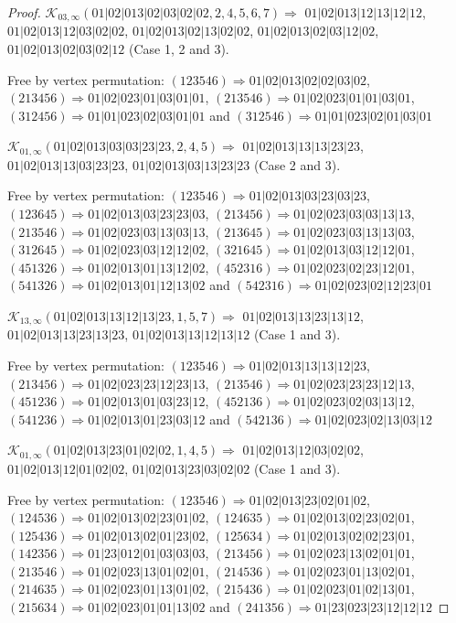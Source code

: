 \documentclass[12pt]{article}
\theoremstyle{plain}
\theoremstyle{definition}
\theoremstyle{remark}
\newcommand{\fancy}[1]{\mathcal{#1}}
\def\K{\fancy{K}}
\begin{document}
\begin{proof}
	
	\bigskip
	
	$\K_{03,\infty}(01|02|013|02|03|02|02,2, 4, 5, 6, 7)\Rightarrow $ $01|02|013|12|13|12|12$, $01|02|013|12|03|02|02$, $01|02|013|02|13|02|02$, $01|02|013|02|03|12|02$, $01|02|013|02|03|02|12$ (Case 1, 2 and 3).
	
	
	
	Free by vertex permutation: $(1 2 3 5 4 6)\Rightarrow 01|02|013|02|02|03|02$, $(2 1 3 4 5 6)\Rightarrow 01|02|023|01|03|01|01$, $(2 1 3 5 4 6)\Rightarrow 01|02|023|01|01|03|01$, $(3 1 2 4 5 6)\Rightarrow 01|01|023|02|03|01|01$ and $(3 1 2 5 4 6)\Rightarrow 01|01|023|02|01|03|01$
	
	
	\bigskip
	
	$\K_{01,\infty}(01|02|013|03|03|23|23,2, 4, 5)\Rightarrow $ $01|02|013|13|13|23|23$, $01|02|013|13|03|23|23$, $01|02|013|03|13|23|23$ (Case 2 and 3).
	
	
	
	Free by vertex permutation: $(1 2 3 5 4 6)\Rightarrow 01|02|013|03|23|03|23$, $(1 2 3 6 4 5)\Rightarrow 01|02|013|03|23|23|03$, $(2 1 3 4 5 6)\Rightarrow 01|02|023|03|03|13|13$, $(2 1 3 5 4 6)\Rightarrow 01|02|023|03|13|03|13$, $(2 1 3 6 4 5)\Rightarrow 01|02|023|03|13|13|03$, $(3 1 2 6 4 5)\Rightarrow 01|02|023|03|12|12|02$, $(3 2 1 6 4 5)\Rightarrow 01|02|013|03|12|12|01$, $(4 5 1 3 2 6)\Rightarrow 01|02|013|01|13|12|02$, $(4 5 2 3 1 6)\Rightarrow 01|02|023|02|23|12|01$, $(5 4 1 3 2 6)\Rightarrow 01|02|013|01|12|13|02$ and $(5 4 2 3 1 6)\Rightarrow 01|02|023|02|12|23|01$
	
	
	\bigskip
	
	$\K_{13,\infty}(01|02|013|13|12|13|23,1, 5, 7)\Rightarrow $ $01|02|013|13|23|13|12$, $01|02|013|13|23|13|23$, $01|02|013|13|12|13|12$ (Case 1 and 3).
	
	
	
	Free by vertex permutation: $(1 2 3 5 4 6)\Rightarrow 01|02|013|13|13|12|23$, $(2 1 3 4 5 6)\Rightarrow 01|02|023|23|12|23|13$, $(2 1 3 5 4 6)\Rightarrow 01|02|023|23|23|12|13$, $(4 5 1 2 3 6)\Rightarrow 01|02|013|01|03|23|12$, $(4 5 2 1 3 6)\Rightarrow 01|02|023|02|03|13|12$, $(5 4 1 2 3 6)\Rightarrow 01|02|013|01|23|03|12$ and $(5 4 2 1 3 6)\Rightarrow 01|02|023|02|13|03|12$
	
	
	\bigskip
	
	$\K_{01,\infty}(01|02|013|23|01|02|02,1, 4, 5)\Rightarrow $ $01|02|013|12|03|02|02$, $01|02|013|12|01|02|02$, $01|02|013|23|03|02|02$ (Case 1 and 3).
	
	
	
	Free by vertex permutation: $(1 2 3 5 4 6)\Rightarrow 01|02|013|23|02|01|02$, $(1 2 4 5 3 6)\Rightarrow 01|02|013|02|23|01|02$, $(1 2 4 6 3 5)\Rightarrow 01|02|013|02|23|02|01$, $(1 2 5 4 3 6)\Rightarrow 01|02|013|02|01|23|02$, $(1 2 5 6 3 4)\Rightarrow 01|02|013|02|02|23|01$, $(1 4 2 3 5 6)\Rightarrow 01|23|012|01|03|03|03$, $(2 1 3 4 5 6)\Rightarrow 01|02|023|13|02|01|01$, $(2 1 3 5 4 6)\Rightarrow 01|02|023|13|01|02|01$, $(2 1 4 5 3 6)\Rightarrow 01|02|023|01|13|02|01$, $(2 1 4 6 3 5)\Rightarrow 01|02|023|01|13|01|02$, $(2 1 5 4 3 6)\Rightarrow 01|02|023|01|02|13|01$, $(2 1 5 6 3 4)\Rightarrow 01|02|023|01|01|13|02$ and $(2 4 1 3 5 6)\Rightarrow 01|23|023|23|12|12|12$
	

\end{proof}
\end{document}

